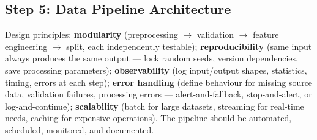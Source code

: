 \subsection{Step 5: Data Pipeline Architecture}

Design principles: \textbf{modularity} (preprocessing $\rightarrow$ validation $\rightarrow$ feature engineering
$\rightarrow$ split, each independently testable); \textbf{reproducibility} (same input always produces the same
output --- lock random seeds, version dependencies, save processing parameters); \textbf{observability} (log
input/output shapes, statistics, timing, errors at each step); \textbf{error handling} (define behaviour for
missing source data, validation failures, processing errors --- alert-and-fallback, stop-and-alert, or
log-and-continue); \textbf{scalability} (batch for large datasets, streaming for real-time needs, caching for
expensive operations). The pipeline should be automated, scheduled, monitored, and documented.

